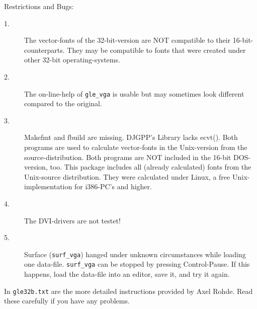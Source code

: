 Restrictions and Bugs:
\begin{description}		
\item[1.] The vector-fonts of the 32-bit-version are NOT compatible to their 
16-bit-counterparts. They may be compatible to fonts that were created 
under other 32-bit operating-systems.
\item[2.] The on-line-help of \verb#gle_vga# is usable but may sometimes look different 
compared to the original.
\item[3.] Makefmt and fbuild are missing. DJGPP's Library lacks ecvt(). 
Both programs are used to calculate vector-fonts in the Unix-version 
from the source-distribution. Both programs are NOT included in the 
16-bit DOS-version, too. This package includes all (already calculated) 
fonts from the Unix-source distribution. They were calculated under Linux, 
a free Unix-implementation for i386-PC's and higher.
\item[4.] The DVI-drivers are not testet! 
\item[5.] Surface (\verb#surf_vga#) hanged under unknown circumstances while loading 
one data-file. \verb#surf_vga# can be stopped by pressing Control-Pause. 
If this happens, load the data-file into an editor, save it, and try it 
again.
\end{description}

In \verb#gle32b.txt# are the more detailed instructions provided by Axel Rohde.
Read these carefully if you have any problems.
